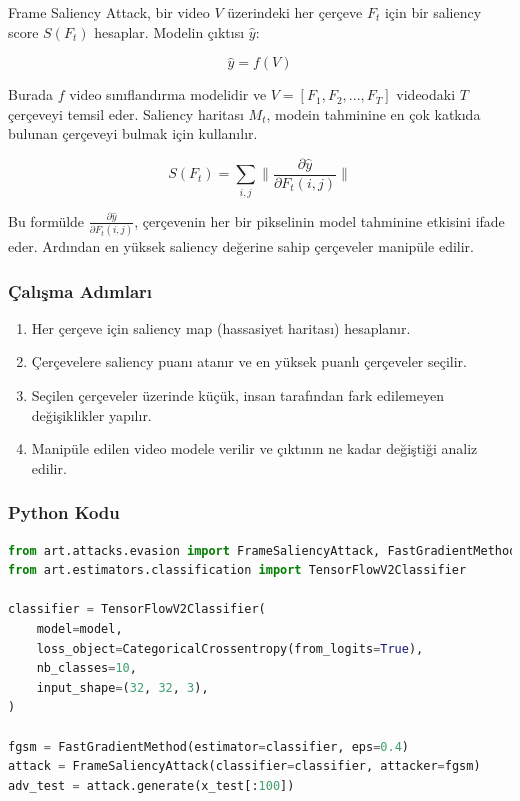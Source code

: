 Frame Saliency Attack, bir video $V$ üzerindeki her çerçeve $F_t$ için bir saliency score $S(F_t)$ hesaplar. Modelin çıktısı $\hat{y}$:

\[ \hat{y} = f(V) \]

Burada $f$ video sınıflandırma modelidir ve $V = [F_1, F_2, ..., F_T]$ videodaki $T$ çerçeveyi temsil eder. Saliency haritası $M_t$, modein tahminine en çok katkıda bulunan çerçeveyi bulmak için kullanılır.

\[ S(F_t) = \sum_{i,j} \| \frac{\partial \hat{y}}{\partial F_t(i, j)} \| \]

Bu formülde $\frac{\partial \hat{y}}{\partial F_t(i, j)}$, çerçevenin her bir pikselinin model tahminine etkisini ifade eder. Ardından en yüksek saliency değerine sahip çerçeveler manipüle edilir.

\subsubsection{Çalışma Adımları}

\begin{enumerate}
    \item Her çerçeve için saliency map (hassasiyet haritası) hesaplanır. 
    \item Çerçevelere saliency puanı atanır ve en yüksek puanlı çerçeveler seçilir.
    \item Seçilen çerçeveler üzerinde küçük, insan tarafından fark edilemeyen değişiklikler yapılır.
    \item Manipüle edilen video modele verilir ve çıktının ne kadar değiştiği analiz edilir.
\end{enumerate}

\subsubsection{Python Kodu}

\begin{lstlisting}[language=Python]
from art.attacks.evasion import FrameSaliencyAttack, FastGradientMethod
from art.estimators.classification import TensorFlowV2Classifier

classifier = TensorFlowV2Classifier(
    model=model,
    loss_object=CategoricalCrossentropy(from_logits=True),
    nb_classes=10,
    input_shape=(32, 32, 3),
)

fgsm = FastGradientMethod(estimator=classifier, eps=0.4)
attack = FrameSaliencyAttack(classifier=classifier, attacker=fgsm)
adv_test = attack.generate(x_test[:100])
\end{lstlisting}


